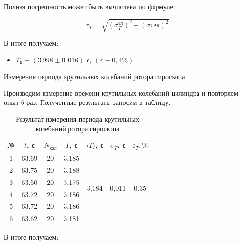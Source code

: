 \documentclass[12pt, a4paper]{article}
\begin{document}
Полная погрешность может быть вычислена по формуле:

\begin{equation}
\sigma_T = \sqrt{\left( \sigma^\text{сл}_T \right)^2 + \left( \sigma\text{сек} \right)^2  }
\end{equation}

В итоге получаем:

\begin{itemize}
	\item \underline{$ T_\text{ц} = \left( 3.998 \pm 0,016\right) $ с, $ \left(\varepsilon = 0,4 \% \right)  $}
\end{itemize}

{\large Измерение периода крутильных колебаний ротора гироскопа}

Производим измерение времени крутильных колебаний цилиндра и повторяем опыт 6 раз. Полученные результаты заносим в таблицу.

\begin{table}[h!]
	\centering
	\begin{tabular}{|c|c|c|c|c|c|c|}
		\hline
		№ & $ t $, с & $ N_\text{кол} $ & $ T $, с & $ \langle T \rangle $, с                & $ \sigma_T $, с             & $ \varepsilon_T , \%$                 \\ \hline
		1 & 63.69 & 20              & 3.185     & \multirow{6}{*}{3,184} & \multirow{6}{*}{0,011} & \multirow{6}{*}{0.35} \\ \cline{1-4}
		2 & 63.75 & 20              & 3.188     &                        &                        &                       \\ \cline{1-4}
        3 & 63.50 & 20              & 3.175     &                        &                        &                       \\ \cline{1-4}
        4 & 63.72 & 20              & 3.186     &                        &                        &                       \\ \cline{1-4}
        5 & 63.72 & 20              & 3.186     &                        &                        &                       \\ \cline{1-4}
		6 & 63.62 & 20              & 3.181     &                        &                        &                       \\ \hline
	\end{tabular}
	\caption{Результат измерения периода крутильных колебаний ротора гироскопа}
\end{table}

В итоге получаем:
\end{document}
